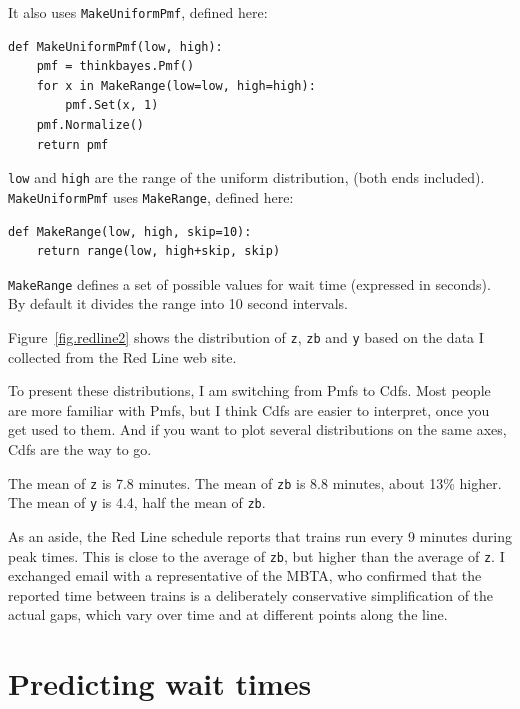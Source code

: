 \documentclass[12pt]{book}
\begin{document}
It also uses {\tt MakeUniformPmf}, defined here:

\begin{verbatim}
def MakeUniformPmf(low, high):
    pmf = thinkbayes.Pmf()
    for x in MakeRange(low=low, high=high):
        pmf.Set(x, 1)
    pmf.Normalize()
    return pmf
\end{verbatim}

{\tt low} and {\tt high} are the range of the uniform distribution,
(both ends included).  {\tt MakeUniformPmf} uses {\tt MakeRange},
defined here:

\begin{verbatim}
def MakeRange(low, high, skip=10):
    return range(low, high+skip, skip)
\end{verbatim}

{\tt MakeRange} defines a set of possible values for wait time
(expressed in seconds).  By default it divides the range into 
10 second intervals.

Figure~\ref{fig.redline2} shows the distribution of {\tt z}, {\tt zb}
and {\tt y} based on the data I collected from the Red Line web site.

To present these distributions, I am switching from Pmfs to Cdfs.
Most people are more familiar with Pmfs, but I think Cdfs are easier
to interpret, once you get used to them.  And if you want to plot
several distributions on the same axes, Cdfs are the way to go.

The mean of {\tt z} is 7.8 minutes.  The mean of {\tt zb} is 8.8
minutes, about 13\% higher.  The mean of {\tt y} is 4.4, half
the mean of {\tt zb}.

As an aside, the Red Line schedule reports that trains run every
9 minutes during peak times.  This is close to the average of
{\tt zb}, but higher than the average of {\tt z}.  I exchanged email
with a representative of the MBTA, who confirmed that the reported
time between trains is a deliberately conservative simplification
of the actual gaps, which vary over time and at different
points along the line.


\section{Predicting wait times}
\label{elapsed}
\end{document}
